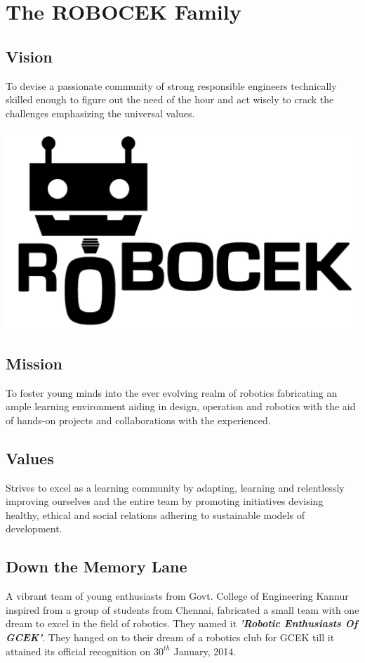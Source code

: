 \cleardoublepage
\chapter{The ROBOCEK Family}
\section{Vision}
\justify
    To devise a passionate community of strong responsible engineers technically skilled enough to figure out the need of the hour and act wisely to crack the challenges emphasizing the universal values.
\begin{marginfigure}
    \includegraphics[width=\textwidth]{Images/ROBOCEK/ROBOCEK_logo_black.jpeg}
\end{marginfigure}

\section{Mission}
    To foster young minds into the ever evolving realm of robotics fabricating an ample learning environment aiding in design, operation and robotics with the aid of hands-on projects and collaborations with the experienced. 
\section{Values}
    Strives to excel as a learning community by adapting, learning and relentlessly improving ourselves and the entire team by promoting initiatives devising healthy, ethical and social relations adhering to sustainable models of development. 

\section{Down the Memory Lane}
\justify
A vibrant team of young enthusiasts from Govt. College of Engineering Kannur inspired from a group of students from Chennai, fabricated a small team with one dream to excel in the field of robotics. They named it \textit{\textbf{'Robotic Enthusiasts Of GCEK'}}. They hanged on to their dream of a robotics club for GCEK till it attained its official recognition on $30^{th}$ January, 2014.

